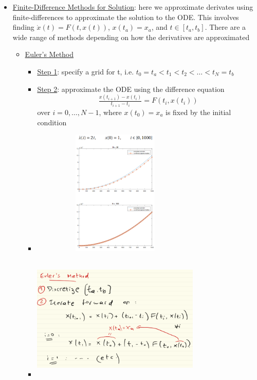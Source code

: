 \documentclass{article}
\begin{document}
\begin{itemize}
\begin{itemize}
    \end{itemize}
    \item  \underline{Finite-Difference Methods for Solution}: here we approximate derivates using finite-differences to approximate the solution to the ODE. This involves finding $\dot{x}(t) = F(t,x(t))$, $x(t_{a}) = x_{a}$, and $t \in [t_{a}, t_{b}]$. There are a wide range of methods depending on how the derivatives are approximated
    \begin{itemize}
        \item  \underline{Euler's Method}
        \begin{itemize}
            \item  \underline{Step 1}: specify a grid for t, i.e. $t_{0} = t_{a} < t_{1} < t_{2} < \dots < t_{N} = t_{b}$
            \item  \underline{Step 2}: approximate the ODE using the difference equation $$\tfrac{x(t_{i+1}) - x(t_{i})}{t_{i+1}-t_{i}} = F(t_{i},x(t_{i}))$$ over $i = 0, \dots, N-1$, where $x(t_{0})=x_{a}$ is fixed by the initial condition
            \item  \includegraphics[width=8cm, height=6cm]{pic6}
            \item  \includegraphics[width=8cm, height=6cm]{pic7}
        \end{itemize}
    \end{itemize}
\end{itemize}
\end{document}
